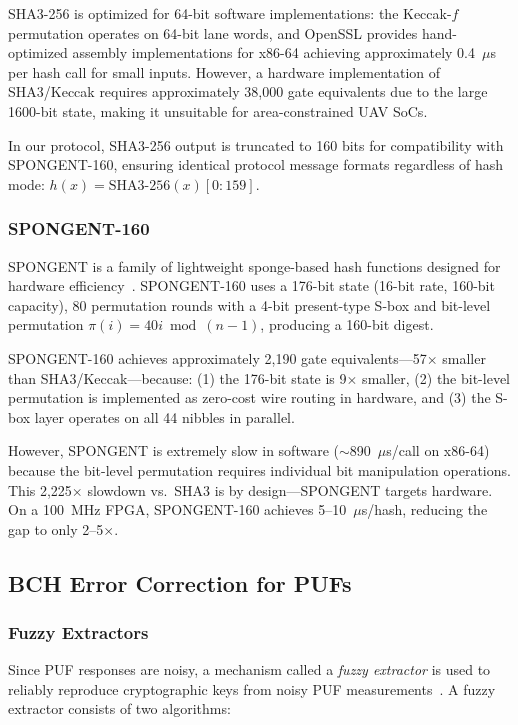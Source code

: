\documentclass[11pt,a4paper]{article}
\begin{document}
SHA3-256 is optimized for 64-bit software implementations: the Keccak-$f$ permutation operates on 64-bit lane words, and OpenSSL provides hand-optimized assembly implementations for x86-64 achieving approximately 0.4~$\mu$s per hash call for small inputs. However, a hardware implementation of SHA3/Keccak requires approximately 38,000 gate equivalents due to the large 1600-bit state, making it unsuitable for area-constrained UAV SoCs.

In our protocol, SHA3-256 output is truncated to 160 bits for compatibility with SPONGENT-160, ensuring identical protocol message formats regardless of hash mode: $h(x) = \text{SHA3-256}(x)[0:159]$.

\subsubsection{SPONGENT-160}

SPONGENT is a family of lightweight sponge-based hash functions designed for hardware efficiency~\cite{spongent_original}. SPONGENT-160 uses a 176-bit state (16-bit rate, 160-bit capacity), 80 permutation rounds with a 4-bit present-type S-box and bit-level permutation $\pi(i) = 40i \bmod (n-1)$, producing a 160-bit digest.

SPONGENT-160 achieves approximately 2,190 gate equivalents---57$\times$ smaller than SHA3/Keccak---because: (1) the 176-bit state is 9$\times$ smaller, (2) the bit-level permutation is implemented as zero-cost wire routing in hardware, and (3) the S-box layer operates on all 44 nibbles in parallel.

However, SPONGENT is extremely slow in software ($\sim$890~$\mu$s/call on x86-64) because the bit-level permutation requires individual bit manipulation operations. This 2,225$\times$ slowdown vs.\ SHA3 is by design---SPONGENT targets hardware. On a 100~MHz FPGA, SPONGENT-160 achieves 5--10~$\mu$s/hash, reducing the gap to only 2--5$\times$.

\subsection{BCH Error Correction for PUFs}
\label{subsec:bch}

\subsubsection{Fuzzy Extractors}

Since PUF responses are noisy, a mechanism called a \emph{fuzzy extractor} is used to reliably reproduce cryptographic keys from noisy PUF measurements~\cite{bch_puf_extraction}. A fuzzy extractor consists of two algorithms:
\end{document}
